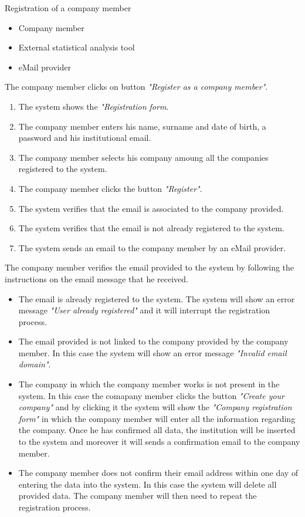 \usecase
{Registration of a company member}
{
    \begin{itemize}
        \item Company member
        \item External statistical analysis tool
        \item eMail provider
    \end{itemize}
}
{
    The company member clicks on button \textit{"Register as a company member"}.
}
{
    \begin{enumerate}
        \item The system shows the \textit{"Registration form}.
        \item The company member enters his name, surname and date of birth, a password and his institutional email.
        \item The company member selects his company amoung all the companies registered to the system.
        \item The company member clicks the button \textit{"Register"}.
        \item The system verifies that the email is associated to the company provided.
        \item The system verifies that the email is not already registered to the system.
        \item The system sends an email to the company member by an eMail provider.
    \end{enumerate}
}
{
    The company member verifies the email provided to the system by following the instructions on the email message that he received.
}
{
    \begin{itemize}
        \item The email is already registered to the system. The system will show an error message \textit{"User already registered"} and it will interrupt the registration process.
        \item The email provided is not linked to the company provided by the company member. In this case the system will show an error message \textit{"Invalid email domain"}.
        \item The company in which the company member works is not present in the system. In this case the comapany member clicks the button \textit{"Create your company"} and by clicking it the system will show the \textit{"Company registration form"} in which the company member will enter all the information regarding the company. Once he has confirmed all data, the institution will be inserted to the system and moreover it will sends a confirmation email to the company member.
        \item The company member does not confirm their email address within one day of entering the data into the system. In this case the system will delete all provided data. The company member will then need to repeat the registration process.
    \end{itemize}
}
{

}

